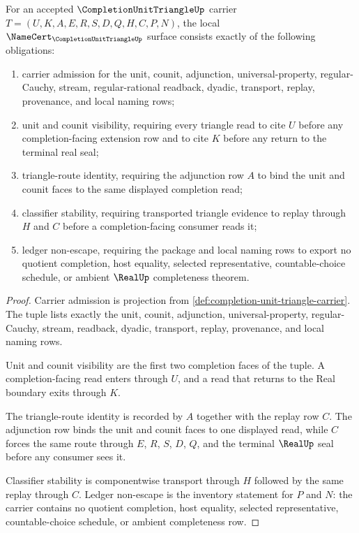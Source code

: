 \begin{theorem}\label{thm:completion-unit-triangle-namecert-obligations}
For an accepted $\CompletionUnitTriangleUp$ carrier $T=(U,K,A,E,R,S,D,Q,H,C,P,N)$, the local $\NameCert_{\CompletionUnitTriangleUp}$ surface consists exactly of the following obligations:
\begin{enumerate}
\item carrier admission for the unit, counit, adjunction, universal-property, regular-Cauchy, stream, regular-rational readback, dyadic, transport, replay, provenance, and local naming rows;
\item unit and counit visibility, requiring every triangle read to cite $U$ before any completion-facing extension row and to cite $K$ before any return to the terminal real seal;
\item triangle-route identity, requiring the adjunction row $A$ to bind the unit and counit faces to the same displayed completion read;
\item classifier stability, requiring transported triangle evidence to replay through $H$ and $C$ before a completion-facing consumer reads it;
\item ledger non-escape, requiring the package and local naming rows to export no quotient completion, host equality, selected representative, countable-choice schedule, or ambient $\RealUp$ completeness theorem.
\end{enumerate}
\end{theorem}
\begin{proof}
Carrier admission is projection from \autoref{def:completion-unit-triangle-carrier}. The tuple lists exactly the unit, counit, adjunction, universal-property, regular-Cauchy, stream, readback, dyadic, transport, replay, provenance, and local naming rows.

Unit and counit visibility are the first two completion faces of the tuple. A completion-facing read enters through $U$, and a read that returns to the Real boundary exits through $K$.

The triangle-route identity is recorded by $A$ together with the replay row $C$. The adjunction row binds the unit and counit faces to one displayed read, while $C$ forces the same route through $E$, $R$, $S$, $D$, $Q$, and the terminal $\RealUp$ seal before any consumer sees it.

Classifier stability is componentwise transport through $H$ followed by the same replay through $C$. Ledger non-escape is the inventory statement for $P$ and $N$: the carrier contains no quotient completion, host equality, selected representative, countable-choice schedule, or ambient completeness row.
\end{proof}

